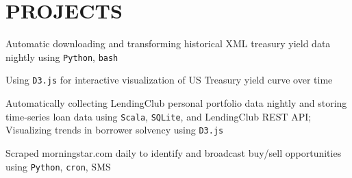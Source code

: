 \documentclass[]{deedy-resume-openfont}
\begin{document}
\sectionsep



\section{PROJECTS}


\begin{tightemize}

\item Automatic downloading and transforming historical XML treasury yield data nightly using \verb|Python|, \verb|bash|

\item Using \verb|D3.js| for interactive visualization of US Treasury yield curve over time

\end{tightemize}


\sectionsep


\begin{tightemize}

\item Automatically collecting LendingClub personal portfolio data nightly and storing time-series loan data using \verb|Scala|, \verb|SQLite|, and LendingClub REST API; Visualizing trends in borrower solvency using \verb|D3.js|

\end{tightemize}


\sectionsep



\begin{tightemize}

\item Scraped morningstar.com daily to identify and broadcast buy/sell opportunities using \verb|Python|, \verb|cron|, SMS


\end{tightemize}
\end{document}
